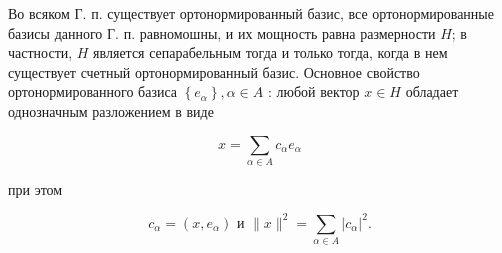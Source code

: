 \documentclass[10pt]{article}
\begin{document}
Во всяком Г. п. существует ортонормированный базис, все ортонормированные базисы данного Г. п. равномошны, и их мощность равна размерности $H$; в частности, $H$ является сепарабельным тогда и только тогда, когда в нем существует счетный ортонормированный базис. Основное свойство ортонормированного базиса $\left\{e_{\alpha}\right\}, \alpha \in A$ : любой вектор $x \in H$ обладает однозначным разложением в виде



\[

x=\sum_{\alpha \in A} c_{\alpha} e_{\alpha}

\]



при этом



\[

c_{\alpha}=\left(x, e_{\alpha}\right) \text { и }\|x\|^{2}=\sum_{\alpha \in A}\left|c_{\alpha}\right|^{2} .

\]
\end{document}
